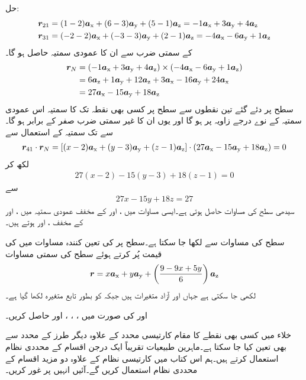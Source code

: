 حل:
\begin{align*}
\kvec{r}_{21}&=(1-2)\ax+(6-3)\ay+(5-1)\az=-1\ax+3\ay+4\az\\
\kvec{r}_{31}&=(-2-2)\ax+(-3-3)\ay+(2-1)\az=-4\ax-6\ay+1\az
\end{align*}
کے سمتی ضرب سے ان کا عمودی سمتیہ حاصل ہو گا۔
\begin{align*}
\kvec{r}_N&=(-1\ax+3\ay+4\az) \times (-4\ax-6\ay+1\az)\\
&=6\az+1\ay+12\az+3\ax-16\ay+24\ax\\
&=27\ax-15\ay+18\az
\end{align*}
سطح پر دئے گئے تین نقطوں سے سطح پر کسی بھی نقطہ  تک کا سمتیہ اس عمودی سمتیہ کے نوے درجے زاویہ پر ہو گا اور یوں ان کا غیر سمتی ضرب صفر کے برابر ہو گا۔ سے  تک سمتیہ  کے استعمال سے
\begin{align*}
\kvec{r}_{41} \cdot \kvec{r}_{N}=[(x-2)\ax+(y-3)\ay+(z-1)\az] \cdot (27\ax-15\ay+18\az)=0
\end{align*}
لکھ کر
\begin{align*}
27(x-2)-15(y-3)+18(z-1)=0
\end{align*}
سے
\begin{align*}
27x-15y+18z=27
\end{align*}
سیدھی سطح کی مساوات حاصل ہوتی ہے۔ایسی مساوات میں ،  اور  کے مخفف عمودی سمتیہ میں ،  اور  کے مخفف ،  اور  ہوتے ہیں۔

سطح کی مساوات سے  لکھا جا سکتا ہے۔سطح پر  کی تعین کنندہ مساوات  میں  کی قیمت پُر کرتے ہوئے  سطح کی سمتی مساوات
\begin{align*}
\kvec{r}=x\ax+y\ay+\left(\frac{9-9x+5y}{6}\right)\az
\end{align*}
لکھی جا سکتی ہے جہاں  اور  آزاد متغیرات ہیں جبکہ  کو بطور تابع متغیرہ لکھا گیا ہے۔

 اور  کی صورت میں ، ، ،  اور  حاصل کریں۔

خلاء میں کسی بھی نقطے کا مقام کارتیسی محدد کے علاوہ دیگر طرز کے محدد سے بھی تعین کیا جا سکتا ہے۔ماہرین طبیعیات  تقریباً ایک درجن اقسام کے محددی نظام استعمال کرتے ہیں۔ہم اس کتاب میں کارتیسی نظام کے علاوہ دو مزید اقسام کے محددی نظام استعمال کریں گے۔آئیں انہیں پر غور کریں۔

